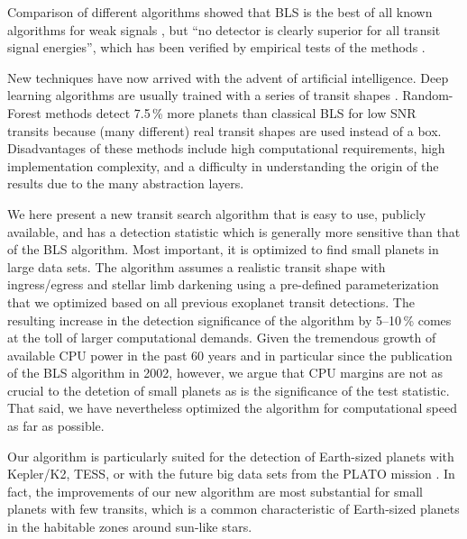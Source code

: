 \documentclass[twocolumn,tighten,longauthor]{myaastex62}
\begin{document}
Comparison of different algorithms showed that BLS is the best of all known algorithms for weak signals \citep{2003A&A...403..329T,2003A&A...408L...5T}, but ``no detector is clearly superior for all transit signal energies'', which has been verified by empirical tests of the methods \citep{2005A&A...437..355M}.

New techniques have now arrived with the advent of artificial intelligence. Deep learning algorithms are usually trained with a series of transit shapes  \citep{2018MNRAS.474..478P,2018AJ....155..147Z,2018MNRAS.478.4225A}. Random-Forest methods detect 7.5\,\% more planets than classical BLS for low SNR transits \citep{2016MNRAS.455..626M} because (many different) real transit shapes are used instead of a box. Disadvantages of these methods include high computational requirements, high implementation complexity, and a difficulty in understanding the origin of the results due to the many abstraction layers.

We here present a new transit search algorithm that is easy to use, publicly available, and has a detection statistic which is generally more sensitive than that of the BLS algorithm. Most important, it is optimized to find small planets in large data sets. The algorithm assumes a realistic transit shape with ingress/egress and stellar limb darkening \citep[as per][]{2002ApJ...580L.171M} using a pre-defined parameterization that we optimized based on all previous exoplanet transit detections. The resulting increase in the detection significance of the algorithm by 5--10\,\% comes at the toll of larger computational demands. Given the tremendous growth of available CPU power in the past 60 years \citep{Moore1965} and in particular since the publication of the BLS algorithm in 2002, however, we argue that CPU margins are not as crucial to the detetion of small planets as is the significance of the test statistic. That said, we have nevertheless optimized the algorithm for computational speed as far as possible. 

Our algorithm is particularly suited for the detection of Earth-sized planets with Kepler/K2, TESS, or with the future big data sets from the PLATO mission \citep{2014ExA....38..249R}. In fact, the improvements of our new algorithm are most substantial for small planets with few transits, which is a common characteristic of Earth-sized planets in the habitable zones around sun-like stars.


	
\end{document}
